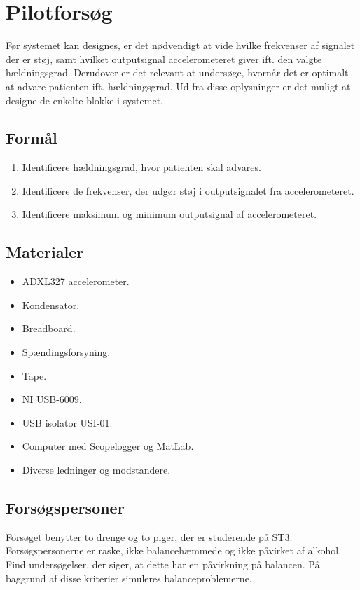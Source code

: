 \section{Pilotforsøg}
Før systemet kan designes, er det nødvendigt at vide hvilke frekvenser af signalet der er støj, samt hvilket outputsignal accelerometeret giver ift. den valgte hældningsgrad. Derudover er det relevant at undersøge, hvornår det er optimalt at advare patienten ift. hældningsgrad. Ud fra disse oplysninger er det muligt at designe de enkelte blokke i systemet.%

\subsection{Formål}
\begin{enumerate}
\item Identificere hældningsgrad, hvor patienten skal advares.
\item Identificere de frekvenser, der udgør støj i outputsignalet fra accelerometeret.
\item Identificere maksimum og minimum outputsignal af accelerometeret.
\end{enumerate}

\subsection{Materialer}
\begin{itemize}
\item ADXL327 accelerometer.
\item Kondensator.
\item Breadboard.
\item Spændingsforsyning.
\item Tape.
\item NI USB-6009.
\item USB isolator USI-01.
\item Computer med Scopelogger og MatLab.
\item Diverse ledninger og modstandere.
\end{itemize}

\subsection{Forsøgspersoner}
Forsøget benytter to drenge og to piger, der er studerende på ST3. Forsøgspersonerne er raske, ikke balancehæmmede og ikke påvirket af alkohol. Find undersøgelser, der siger, at dette har en påvirkning på balancen. På baggrund af disse kriterier simuleres balanceproblemerne. 

